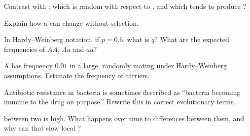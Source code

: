 \begin{exercise}[$\star\star$]\label{exo:g11:evolution-mechanisms:5}
Contrast  with : which is random with respect to
, and which tends to produce ?
\end{exercise}

\begin{exercise}[$\star\star$]\label{exo:g11:evolution-mechanisms:6}
Explain how a  can change  without selection.
\end{exercise}

\begin{exercise}[$\star\star$]\label{exo:g11:evolution-mechanisms:7}
In Hardy--Weinberg notation, if $p = 0.6$, what is $q$? What are the expected
frequencies of $AA$, $Aa$ and $aa$?
\end{exercise}

\begin{exercise}[$\star\star$]\label{exo:g11:evolution-mechanisms:8}
A   has frequency $0.01$ in a large, randomly mating
 under Hardy--Weinberg assumptions. Estimate the frequency of
 carriers.
\end{exercise}

\begin{exercise}[$\star\star\star$]\label{exo:g11:evolution-mechanisms:9}
Antibiotic resistance in bacteria is sometimes described as ``bacteria becoming
immune to the drug on purpose.'' Rewrite this in correct evolutionary terms.
\end{exercise}

\begin{exercise}[$\star\star\star$]\label{exo:g11:evolution-mechanisms:10}
 between two  is high. What happens over time to  differences between them, and why can that slow local ?
\end{exercise}

